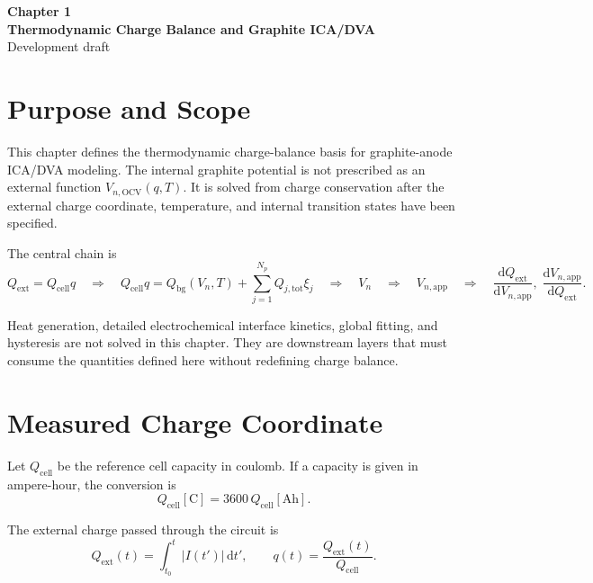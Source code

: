\documentclass[11pt,a4paper]{article}
\newcommand{\dd}{\mathrm{d}}
\newcommand{\OCV}{\mathrm{OCV}}
\newcommand{\app}{\mathrm{app}}
\newcommand{\bg}{\mathrm{bg}}
\newcommand{\cell}{\mathrm{cell}}
\newcommand{\ext}{\mathrm{ext}}
\newcommand{\tot}{\mathrm{tot}}
\newcommand{\Ah}{\mathrm{Ah}}
\newcommand{\Cunit}{\mathrm{C}}
\begin{document}
\begin{center}
{\LARGE \textbf{Chapter 1}}\\[0.3em]
{\LARGE \textbf{Thermodynamic Charge Balance and Graphite ICA/DVA}}\\[0.8em]
{\large Development draft}
\end{center}

\tableofcontents
\newpage

\section{Purpose and Scope}

This chapter defines the thermodynamic charge-balance basis for graphite-anode
ICA/DVA modeling.  The internal graphite potential is not prescribed as an
external function \(V_{n,\OCV}(q,T)\).  It is solved from charge conservation
after the external charge coordinate, temperature, and internal transition
states have been specified.

The central chain is
\begin{equation}
Q_{\ext}=Q_{\cell}q
\quad\Longrightarrow\quad
Q_{\cell}q =
Q_{\bg}(V_n,T)+\sum_{j=1}^{N_p}Q_{j,\tot}\xi_j
\quad\Longrightarrow\quad
V_n
\quad\Longrightarrow\quad
V_{n,\app}
\quad\Longrightarrow\quad
\frac{\dd Q_{\ext}}{\dd V_{n,\app}},\;
\frac{\dd V_{n,\app}}{\dd Q_{\ext}} .
\label{eq:chapter1_spine}
\end{equation}

Heat generation, detailed electrochemical interface kinetics, global fitting,
and hysteresis are not solved in this chapter.  They are downstream layers that
must consume the quantities defined here without redefining charge balance.

\section{Measured Charge Coordinate}

Let \(Q_{\cell}\) be the reference cell capacity in coulomb.  If a capacity is
given in ampere-hour, the conversion is
\begin{equation}
Q_{\cell}[\Cunit]=3600\,Q_{\cell}[\Ah].
\end{equation}

The external charge passed through the circuit is
\begin{equation}
Q_{\ext}(t)=\int_{t_0}^{t}|I(t')|\,\dd t',
\qquad
q(t)=\frac{Q_{\ext}(t)}{Q_{\cell}} .
\label{eq:q_definition}
\end{equation}
\end{document}
